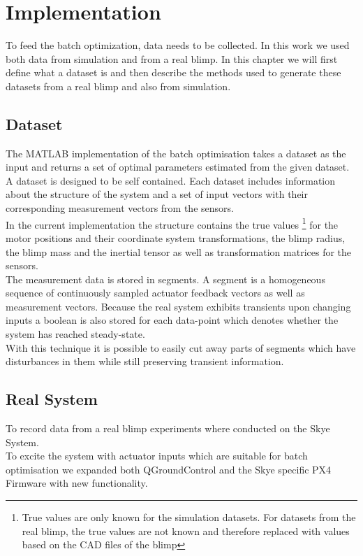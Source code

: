 \chapter{Implementation}
\label{chap:implementation}

To feed the batch optimization, data needs to be collected.
In this work we used both data from simulation and from a real blimp.
In this chapter we will first define what a dataset is and then 
describe the methods used to generate these datasets from a real blimp and also from simulation.

\section{Dataset}
\label{sec:dataset}
The \textsc{MATLAB} implementation of the batch optimisation takes a dataset as the input and returns a set of optimal parameters estimated from the given dataset. \\
A dataset is designed to be self contained. 
Each dataset includes information about the structure of the system and a set of input vectors with their corresponding measurement vectors from the sensors. \\
In the current implementation the structure contains the true values
\footnote{True values are only known for the simulation datasets. 
For datasets from the real blimp, the true values are not known and therefore replaced with values based on the CAD files of the blimp}
for the motor positions and their coordinate system transformations, the blimp radius, the blimp mass and the inertial tensor as well as transformation matrices for the sensors. \\
The measurement data is stored in segments.
A segment is a homogeneous sequence of continuously sampled actuator feedback vectors as well as measurement vectors.
Because the real system exhibits transients upon changing inputs a boolean is also stored for each data-point which denotes whether the system has reached steady-state. \\
With this technique it is possible to easily cut away parts of segments which have disturbances in them while still preserving transient information.

\section{Real System}
\label{sec:real_system}
To record data from a real blimp experiments where conducted on the Skye System. \\
To excite the system with actuator inputs which are suitable for batch optimisation we expanded both QGroundControl and the Skye specific PX4 Firmware with new functionality.

